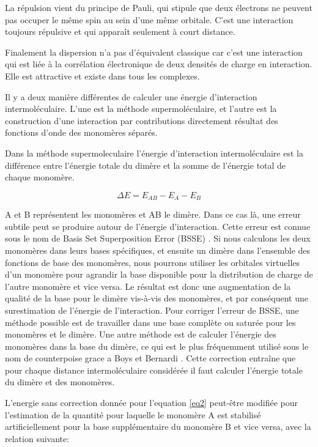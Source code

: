 La répulsion vient du principe de Pauli, qui stipule que deux électrons ne peuvent pas occuper le même spin au sein d’une même orbitale. C’est une interaction toujours répulsive et qui apparaît seulement à court distance.

Finalement la dispersion n’a pas d’équivalent classique car c’est une interaction qui est liée à la corrélation électronique de deux densités de charge en interaction. Elle est attractive et existe dans tous les complexes.

Il y a deux manière différentes de calculer une énergie d’interaction intermoléculaire. L’une est la méthode supermoléculaire, et l’autre est la construction d’une interaction par contributions directement résultat des fonctions d’onde des monomères séparés.

Dans la méthode supermoleculaire l’énergie d’interaction intermoléculaire est la différence entre l’énergie totale du dimère et la somme de l’énergie total de chaque monomère.


\begin{equation}
\Delta E = E_{AB} - E_{A} - E_{B} \label{eq2}
\end{equation}

A et B représentent les monomères et AB le dimère. Dans ce cas là, une erreur subtile peut se produire autour de l’énergie d’interaction. Cette erreur est connue sous le nom de Basis Set Superposition Error (BSSE) \cite{sherrill2010counterpoise}. Si nous calculons les deux monomères dans leurs bases spécifiques, et ensuite un dimère dans l’ensemble des fonctions de base des monomères, nous pourrons utiliser les orbitales virtuelles d’un monomère pour agrandir la base disponible pour la distribution de charge de l’autre monomère et vice versa. Le résultat est donc une augmentation de la qualité de la base pour le dimère vis-à-vis des monomères, et par conséquent une surestimation de l’énergie de l’interaction. Pour corriger l’erreur de BSSE, une méthode possible est de travailler dans une base complète ou saturée pour les monomères et le dimère. Une autre méthode est de calculer l’énergie des monomères dans la base du dimère, ce qui est le plus fréquemment utilisé sous le nom de counterpoise grace a Boys et Bernardi \cite{boys1970calculation}. Cette correction entraîne que pour chaque distance intermoléculaire considérée il faut calculer l’énergie totale du dimère et des monomères.

L'energie sans correction donnée pour l'equation \ref{eq2}  peut-être modifiée pour l'estimation de la quantité pour laquelle le monomère A est stabilisé artificiellement pour la base supplémentaire du monomère B et vice versa, avec la relation suivante:

